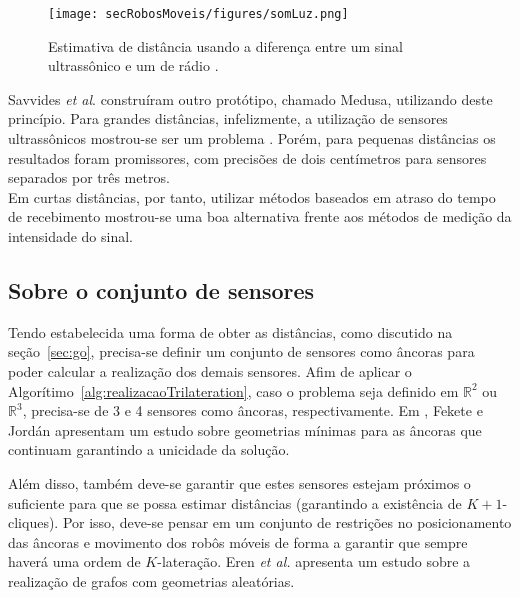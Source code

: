 \begin{figure}[H]
	\begin{center}
		\texttt{[image: secRobosMoveis/figures/somLuz.png]}
	\end{center}
	\caption{Estimativa de distância usando a diferença entre um sinal ultrassônico e um de rádio \cite{savvides2001dynamic}.}
	\label{fig:somLuz}
\end{figure}

Savvides \textit{et al}. \cite{savvides2001dynamic} construíram outro protótipo, chamado Medusa, utilizando deste princípio. Para grandes distâncias, infelizmente, a utilização de sensores ultrassônicos mostrou-se ser um problema \cite{sensorsForMobileRobots}. Porém, para pequenas distâncias os resultados foram promissores, com precisões de dois centímetros para sensores separados por três metros.
\\

Em curtas distâncias, por tanto, utilizar métodos baseados em atraso do tempo de recebimento mostrou-se uma boa alternativa frente aos métodos de medição da intensidade do sinal. 

\subsection{Sobre o conjunto de sensores}

Tendo estabelecida uma forma de obter as distâncias, como discutido na seção~\ref{sec:go}, precisa-se definir um conjunto de sensores como âncoras para poder calcular a realização dos demais sensores. Afim de aplicar o Algorítimo~\ref{alg:realizacaoTrilateration}, caso o problema seja definido em $\mathbb{R}^2$ ou $\mathbb{R}^3$, precisa-se de 3 e 4 sensores como âncoras, respectivamente. Em \cite{wsnlFewAnchors}, Fekete e Jordán apresentam um estudo sobre geometrias mínimas para as âncoras que continuam garantindo a unicidade da solução.

Além disso, também deve-se garantir que estes sensores estejam próximos o suficiente para que se possa estimar distâncias (garantindo a existência de $K+1$-cliques). Por isso, deve-se pensar em um conjunto de restrições no posicionamento das âncoras e movimento dos robôs móveis de forma a garantir que sempre haverá uma ordem de $K$-lateração. Eren \textit{et al.} \cite{eren2004rigidity} apresenta um estudo sobre a realização de grafos com geometrias aleatórias. 

